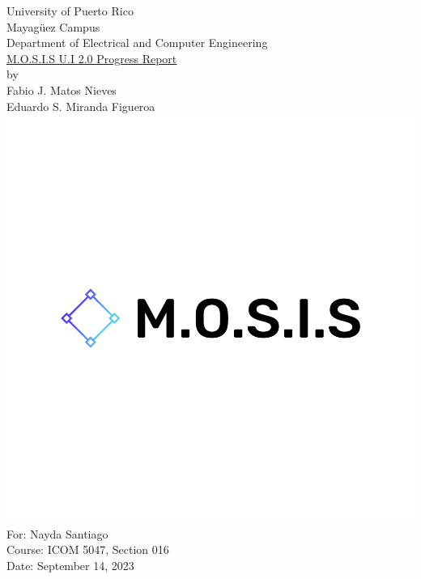 \linespread{1.0}
\begin{titlepage}
	\begin{center}
		\large{University of Puerto Rico\\
			Mayagüez Campus\\
			\vspace{\baselineskip}
			Department of Electrical and Computer Engineering}\\
		\vspace{5\baselineskip}
		\Huge{\underline{M.O.S.I.S U.I 2.0 Progress Report}\\}
		\vspace{\baselineskip}
		\large by\\
		Fabio J. Matos Nieves\\
		Eduardo S. Miranda Figueroa\\
		\normalsize
		\includegraphics[scale=0.15]{../../M.O.S.I.S Logo/default.png}\\
		\vspace{4\baselineskip}
		\large
		For: Nayda Santiago\\
		Course: ICOM 5047, Section 016\\
		Date: September 14, 2023\\
		\normalsize

	\end{center}
\end{titlepage}
